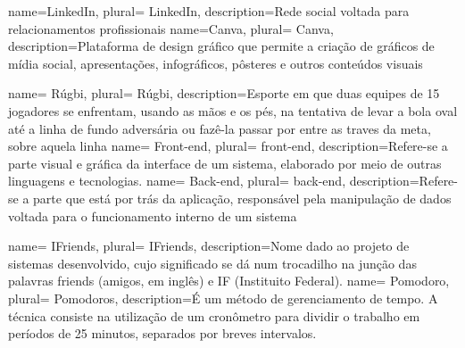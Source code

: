 



 {
    name=LinkedIn,
    plural= {LinkedIn},
    description={Rede social voltada para relacionamentos profissionais}
}
 {
    name=Canva,
    plural= {Canva},
    description={Plataforma de design gráfico que permite a criação de gráficos de mídia social, apresentações, infográficos, pôsteres e outros conteúdos visuais}
}

 {
    name= R{\'u}gbi,
    plural= {R{\'u}gbi},
    description={Esporte em que duas equipes de 15 jogadores se enfrentam, usando as mãos e os pés, na tentativa de levar a bola oval at{\'e} a linha de fundo adversária ou faz{\^e}-la passar por entre as traves da meta, sobre aquela linha }
}
 {
    name= Front-end,
    plural= {front-end},
    description={Refere-se a parte visual e gráfica da interface de um sistema, elaborado por meio de outras linguagens e tecnologias.}
}
 {
    name= Back-end,
    plural= {back-end},
    description={Refere-se a parte que está por trás da aplicação, responsável pela manipulação de dados voltada para o funcionamento interno de um sistema}
}

 {
    name= IFriends,
    plural= {IFriends},
    description={Nome dado ao projeto de sistemas desenvolvido, cujo significado se dá num trocadilho na junção das palavras friends (amigos, em inglês) e IF (Instituito Federal).}
}
 {
    name= Pomodoro,
    plural= {Pomodoros},
    description={É um método de gerenciamento de tempo. A técnica consiste na utilização de um cronômetro para dividir o trabalho em períodos de 25 minutos, separados por breves intervalos.}
}

